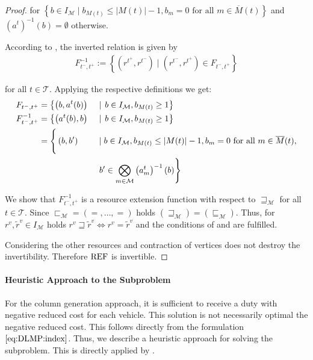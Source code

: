 \begin{proof}
for $\left\{b\in I_{\mathcal{M}}\mid b_{M(t)}\leq\vert M(t)\vert - 1, b_m=0 \text{ for all } m\in\overline{M}(t)\right\}$ and $\left(a^t\right)^{-1}(b) = \emptyset$ otherwise.

According to , the inverted relation is given by
\begin{align*}
	F^{-1}_{t^-,t^+} := \left\{\left(r^{t^+},r^{t^-}\right)\mid \left(r^{t^-},r^{t^+}\right)\in F_{t^-,t^+}\right\}
\end{align*}

for all $t\in\mathcal{T}$. Applying the respective definitions we get:
\begin{align*}
	F_{t^-,t^+} & = \left\{\left(b, a^t(b)\right)\right. && \mid \left. b\in I_{\mathcal{M}}, b_{M(t)}\geq 1\right\} \\
	F^{-1}_{t^-,t^+} & = \left\{\left(a^t(b), b\right)\right. && \mid \left. b\in I_{\mathcal{M}}, b_{M(t)}\geq 1\right\} \\
	& = \left\{\vphantom{\bigotimes_{m\in\mathcal{M}}}\left(b, b'\right)\right. && \mid b\in I_{\mathcal{M}}, b_{M(t)}\leq\vert M(t)\vert-1, b_m=0 \text{ for all } m\in\overline{M}(t), \\
	&&& \left. b'\in\bigotimes_{m\in\mathcal{M}}\left(a^t_m\right)^{-1}(b)\right\}
\end{align*}

We show that $F^{-1}_{t^-,t^+}$ is a resource extension function with respect to $\sqsupseteq_{\mathcal{M}}$ for all $t\in\mathcal{T}$. Since ${\sqsubset_{\mathcal{M}} = \left(=,\dots,=\right)}$ holds ${\left(\sqsupseteq_{\mathcal{M}}\right) = \left(\sqsubseteq_{\mathcal{M}}\right)}$. Thus, for ${r^v,\tilde{r}^v\in I_{\mathcal{M}}}$ holds ${r^v\sqsupseteq\tilde{r}^v\Leftrightarrow r^v = \tilde{r}^v}$ and the conditions of  and  are fulfilled.

Considering the other resources and contraction of vertices does not destroy the invertibility. Therefore $\operatorname{REF}$ is invertible.
%
\end{proof}

\paragraph{Heuristic Approach to the Subproblem} \parfill

For the column generation approach, it is sufficient to receive a duty with negative reduced cost for each vehicle. This solution is not necessarily optimal \wrt the negative reduced cost. This follows directly from the formulation $\eqref{eq:DLMP:index}$. Thus, we describe a heuristic approach for solving the subproblem. This is directly applied by \cite[pp.~104-107]{Kaiser}.

